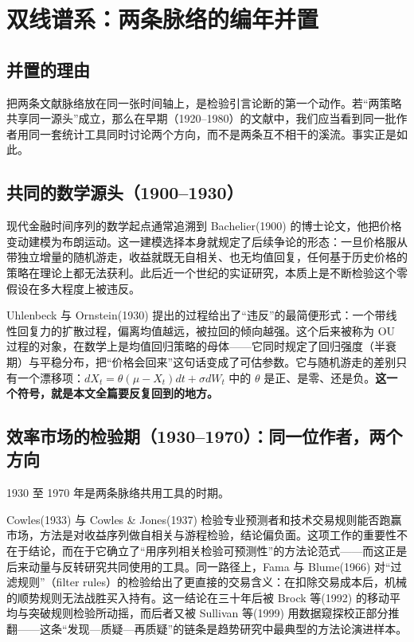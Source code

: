 \section{双线谱系：两条脉络的编年并置}\label{sec:genealogy}

\subsection{并置的理由}

把两条文献脉络放在同一张时间轴上，是检验引言论断的第一个动作。若“两策略共享同一源头”成立，那么在早期（1920--1980）的文献中，我们应当看到同一批作者用同一套统计工具同时讨论两个方向，而不是两条互不相干的溪流。事实正是如此。

\subsection{共同的数学源头（1900--1930）}

现代金融时间序列的数学起点通常追溯到 Bachelier(1900) 的博士论文，他把价格变动建模为布朗运动\cite{bachelier1900}。这一建模选择本身就规定了后续争论的形态：一旦价格服从带独立增量的随机游走，收益就既无自相关、也无均值回复，任何基于历史价格的策略在理论上都无法获利。此后近一个世纪的实证研究，本质上是不断检验这个零假设在多大程度上被违反。

Uhlenbeck 与 Ornstein(1930) 提出的过程给出了“违反”的最简便形式：一个带线性回复力的扩散过程，偏离均值越远，被拉回的倾向越强\cite{uo1930}。这个后来被称为 OU 过程的对象，在数学上是均值回归策略的母体——它同时规定了回归强度（半衰期）与平稳分布，把“价格会回来”这句话变成了可估参数。它与随机游走的差别只有一个漂移项：$dX_t=\theta(\mu-X_t)dt+\sigma dW_t$ 中的 $\theta$ 是正、是零、还是负。\textbf{这一个符号，就是本文全篇要反复回到的地方。}

\subsection{效率市场的检验期（1930--1970）：同一位作者，两个方向}

1930 至 1970 年是两条脉络共用工具的时期。

Cowles(1933) 与 Cowles \& Jones(1937) 检验专业预测者和技术交易规则能否跑赢市场，方法是对收益序列做自相关与游程检验，结论偏负面\cite{cowles1933,cowlesjones1937}。这项工作的重要性不在于结论，而在于它确立了“用序列相关检验可预测性”的方法论范式——而这正是后来动量与反转研究共同使用的工具。同一路径上，Fama 与 Blume(1966) 对“过滤规则”（filter rules）的检验给出了更直接的交易含义：在扣除交易成本后，机械的顺势规则无法战胜买入持有\cite{famablume1966}。这一结论在三十年后被 Brock 等(1992) 的移动平均与突破规则检验所动摇\cite{brock1992}，而后者又被 Sullivan 等(1999) 用数据窥探校正部分推翻\cite{sullivan1999}——这条“发现—质疑—再质疑”的链条是趋势研究中最典型的方法论演进样本。


